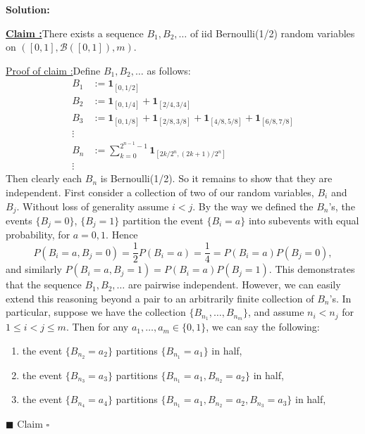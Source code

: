 \documentclass[12pt]{article}
\newcounter{ProofCounter}
\newcounter{ClaimCounter}[ProofCounter]
\newenvironment{Solution}{\stepcounter{ProofCounter}\textbf{Solution:}}{\hfill$\square$}
\newenvironment{claim}[1]{\vspace{1mm}\stepcounter{ClaimCounter}\par\noindent\underline{\bf Claim \theClaimCounter:}\space#1}{}
\newenvironment{claimproof}[1]{\par\noindent\underline{Proof of claim \theClaimCounter:}\space#1}{\hfill $\blacksquare$ Claim \theClaimCounter}
\begin{document}
\begin{Solution}
  \begin{claim}
    There exists a sequence $B_1, B_2, \dots$ of iid Bernoulli(1/2) random variables on $([0, 1], \mathcal{B}([0,1]), m)$.
  \end{claim}
  \begin{claimproof}
    Define $B_1, B_2, \dots$ as follows:
    \begin{align*}
      B_1 & := \bm{1}_{[0,1/2]} \\
      B_2 & := \bm{1}_{[0,1/4]} + \bm{1}_{[2/4,3/4]} \\
      B_3 & := \bm{1}_{[0,1/8]} + \bm{1}_{[2/8,3/8]} + \bm{1}_{[4/8,5/8]} + \bm{1}_{[6/8,7/8]} \\
      \vdots & \\
      B_n & := \sum_{k=0}^{2^{n-1} - 1} \bm{1}_{[2k/2^n,(2k+1)/2^n]} \\
      \vdots &
    \end{align*}
    Then clearly each $B_n$ is Bernoulli(1/2). So it remains to show that they are independent. First consider a collection of two of our random variables, $B_i$ and $B_j$. Without loss of generality assume $i < j$. By the way we defined the $B_n$'s, the events $\{ B_j = 0 \}$, $\{ B_j = 1 \}$ partition the event $\{ B_i = a \}$ into subevents with equal probability, for $a = 0, 1$. Hence
    \[
      P(B_i = a, B_j = 0) = \frac{1}{2}P(B_i = a) = \frac{1}{4} = P(B_i = a)P(B_j = 0),
    \]
    and similarly $P(B_i = a, B_j = 1) = P(B_i = a)P(B_j = 1)$. This demonstrates that the sequence $B_1, B_2, \dots$ are pairwise independent. However, we can easily extend this reasoning beyond a pair to an arbitrarily finite collection of $B_n$'s. In particular, suppose we have the collection $\{ B_{n_1}, \dots, B_{n_m} \}$, and assume $n_i < n_j$ for $1 \leq i < j \leq m$. Then for any $a_1, \dots, a_m \in \{0, 1\}$, we can say the following:
    \begin{enumerate}
      \item the event $\{ B_{n_2} = a_2 \}$ partitions $\{ B_{n_1} = a_1 \}$ in half,
      \item the event $\{ B_{n_3} = a_3 \}$ partitions $\{ B_{n_1} = a_1, B_{n_2} = a_2 \}$ in half,
      \item the event $\{ B_{n_4} = a_4 \}$ partitions $\{ B_{n_1} = a_1, B_{n_2} = a_2, B_{n_3} = a_3 \}$ in half,


\end{enumerate}
\end{claimproof}
\end{Solution}
\end{document}

